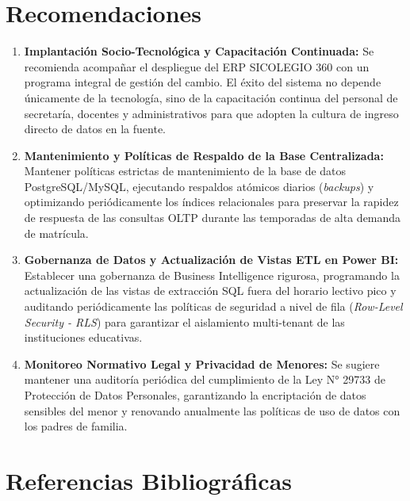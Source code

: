 \documentclass[12pt,a4paper,oneside]{report}
\begin{document}
\chapter*{Recomendaciones}

\begin{enumerate}
    \item \textbf{Implantación Socio-Tecnológica y Capacitación Continuada:} Se recomienda acompañar el despliegue del ERP SICOLEGIO 360 con un programa integral de gestión del cambio. El éxito del sistema no depende únicamente de la tecnología, sino de la capacitación continua del personal de secretaría, docentes y administrativos para que adopten la cultura de ingreso directo de datos en la fuente.
    \item \textbf{Mantenimiento y Políticas de Respaldo de la Base Centralizada:} Mantener políticas estrictas de mantenimiento de la base de datos PostgreSQL/MySQL, ejecutando respaldos atómicos diarios (\textit{backups}) y optimizando periódicamente los índices relacionales para preservar la rapidez de respuesta de las consultas OLTP durante las temporadas de alta demanda de matrícula.
    \item \textbf{Gobernanza de Datos y Actualización de Vistas ETL en Power BI:} Establecer una gobernanza de Business Intelligence rigurosa, programando la actualización de las vistas de extracción SQL fuera del horario lectivo pico y auditando periódicamente las políticas de seguridad a nivel de fila (\textit{Row-Level Security - RLS}) para garantizar el aislamiento multi-tenant de las instituciones educativas.
    \item \textbf{Monitoreo Normativo Legal y Privacidad de Menores:} Se sugiere mantener una auditoría periódica del cumplimiento de la Ley N° 29733 de Protección de Datos Personales, garantizando la encriptación de datos sensibles del menor y renovando anualmente las políticas de uso de datos con los padres de familia.
\end{enumerate}

\chapter*{Referencias Bibliográficas}
\end{document}
